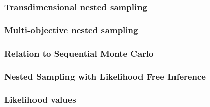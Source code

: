 \documentclass[aspectratio=169,handout]{beamer}
\begin{document}
\begin{frame}
    \frametitle{Transdimensional nested sampling}
\end{frame}

\begin{frame}
    \frametitle{Multi-objective nested sampling}
\end{frame}

\begin{frame}
    \frametitle{Relation to Sequential Monte Carlo}
\end{frame}

\begin{frame}
    \frametitle{Nested Sampling with Likelihood Free Inference}
\end{frame}

\begin{frame}
    \frametitle{Likelihood values}
\end{frame}
\end{document}
